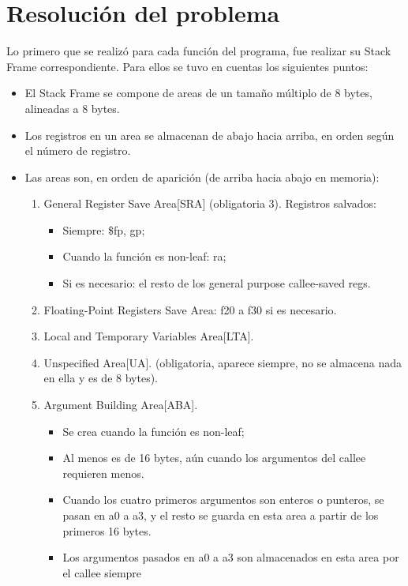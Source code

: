 \documentclass[a4paper,10pt]{article}
\begin{document}
\section{Resoluci\'on del problema}
  Lo primero que se realiz\'o para cada funci\'on del programa, fue realizar su Stack Frame correspondiente.
  Para ellos se tuvo en cuentas los siguientes puntos: 
  \begin{itemize}
    \item El Stack Frame se compone de areas de un tama\~no m\'ultiplo de 8 bytes, alineadas a 8 bytes.
    \item Los registros en un area se almacenan de abajo hacia arriba, en orden seg\'un el n\'umero de registro.
    \item Las areas son, en orden de aparici\'on (de arriba hacia abajo en memoria):
      \begin{enumerate}
	  \item General Register Save Area[SRA] (obligatoria 3). Registros salvados:
	    \begin{itemize}
	      \item Siempre: \$fp, gp;
	      \item Cuando la funci\'on es non-leaf: ra;
	      \item Si es necesario: el resto de los general purpose callee-saved regs.
	    \end{itemize}
	  \item Floating-Point Registers Save Area: f20 a f30 si es necesario.
	  \item Local and Temporary Variables Area[LTA].
	  \item Unspecified Area[UA]. (obligatoria, aparece siempre, no se almacena nada en ella y es de 8 bytes).
	  \item Argument Building Area[ABA].
	    \begin{itemize}
	      \item Se crea cuando la funci\'on es non-leaf;
	      \item Al menos es de 16 bytes, a\'un cuando los argumentos del callee requieren menos.
	      \item Cuando los cuatro primeros argumentos son enteros o punteros, se pasan en a0 a a3, y el resto se guarda en esta area a partir de los primeros 16 bytes.
	      \item Los argumentos pasados en a0 a a3 son almacenados en esta area por el callee siempre
	    \end{itemize}
      \end{enumerate}
  \end{itemize}
  
\end{document}
